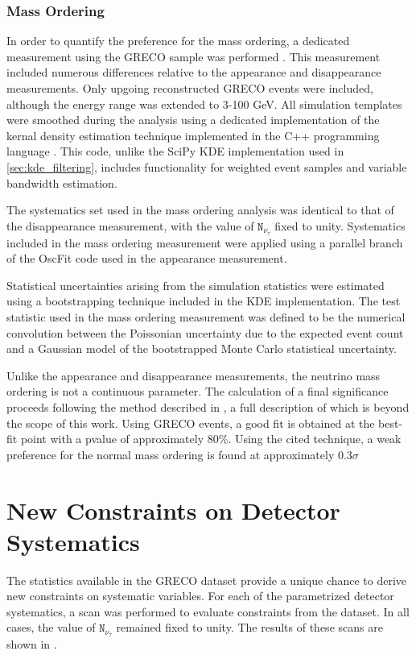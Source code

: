 \subsubsection{Mass Ordering}
In order to quantify the preference for the mass ordering, a dedicated measurement using the GRECO sample was performed .
This measurement included numerous differences relative to the appearance and disappearance measurements.
Only upgoing reconstructed GRECO events were included, although the energy range was extended to 3-100 GeV.
All simulation templates were smoothed during the analysis using a dedicated implementation of the kernal density estimation technique implemented in the C++ programming language .
This code, unlike the SciPy KDE implementation used in \ref{sec:kde_filtering}, includes functionality for weighted event samples and variable bandwidth estimation.

The systematics set used in the mass ordering analysis was identical to that of the disappearance measurement, with the value of $\mathtt{N_{\nu_\tau}}$ fixed to unity.
Systematics included in the mass ordering measurement were applied using a parallel branch of the OscFit code used in the appearance measurement.

Statistical uncertainties arising from the simulation statistics were estimated using a bootstrapping technique included in the KDE implementation.
The test statistic used in the mass ordering measurement was defined to be the numerical convolution between the Poissonian uncertainty due to the expected event count and a Gaussian model of the bootstrapped Monte Carlo statistical uncertainty.

Unlike the appearance and disappearance measurements, the neutrino mass ordering is not a continuous parameter. 
The calculation of a final significance proceeds following the method described in , a full description of which is beyond the scope of this work.
Using GRECO events, a good fit is obtained at the best-fit point with a pvalue of approximately 80\%.
Using the cited technique, a weak preference for the normal mass ordering is found at approximately 0.3$\mathtt{\sigma}$ 

\label{subsec:syst_constraints}
\section{New Constraints on Detector Systematics}
The statistics available in the GRECO dataset provide a unique chance to derive new constraints on systematic variables.
For each of the parametrized detector systematics, a scan was performed to evaluate constraints from the dataset.
In all cases, the value of $\mathtt{N_{\nu_\tau}}$ remained fixed to unity.
The results of these scans are shown in .

